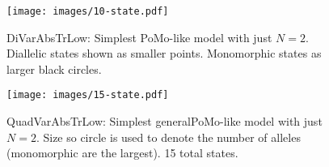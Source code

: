 \documentclass{llncs}
\newcommand{\virtPopSize}{\ensuremath{N}}
\newcommand{\pomo}{PoMo\xspace}
\begin{document}
\begin{figure}
    \begin{center}
        \texttt{[image: images/10-state.pdf]}
        \caption{DiVarAbsTrLow: Simplest \pomo-like model with just $\virtPopSize=2$. Diallelic states shown as smaller points. Monomorphic states as larger black circles.}\label{pomoDiVarAbsTrLow}
    \end{center}
\end{figure}
\begin{figure}
    \begin{center}
        \texttt{[image: images/15-state.pdf]}
        \caption{QuadVarAbsTrLow: Simplest general\pomo-like model with just $\virtPopSize=2$. Size so circle is used to denote the number of alleles (monomorphic are the largest). 15 total states.}\label{pomoQuadVarAbsTrLow}
    \end{center}
\end{figure}


\end{document}
